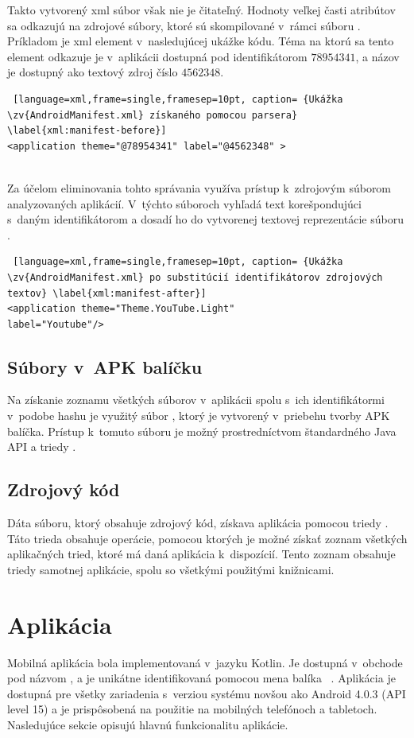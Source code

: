 Takto vytvorený xml súbor však nie je čitateľný. Hodnoty veľkej časti atribútov sa odkazujú na zdrojové súbory, ktoré sú skompilované v~rámci súboru . Príkladom je xml element  v~nasledujúcej ukážke kódu. Téma na ktorú sa tento element odkazuje je v~aplikácii dostupná pod identifikátorom $78954341$, a názov je dostupný ako textový zdroj číslo $4562348$.
\mbox{}\\
\begin{lstlisting} [language=xml,frame=single,framesep=10pt, caption= {Ukážka \zv{AndroidManifest.xml} získaného pomocou parsera} \label{xml:manifest-before}]
<application theme="@78954341" label="@4562348" >
\end{lstlisting}
\mbox{}\\
Za účelom eliminovania tohto správania využíva  prístup k~zdrojovým súborom analyzovaných aplikácií. V~týchto súboroch vyhľadá text korešpondujúci s~daným identifikátorom a dosadí ho do vytvorenej textovej reprezentácie súboru .
\mbox{}\\
\begin{lstlisting} [language=xml,frame=single,framesep=10pt, caption= {Ukážka \zv{AndroidManifest.xml} po substitúcií identifikátorov zdrojových textov} \label{xml:manifest-after}]
<application theme="Theme.YouTube.Light" 
label="Youtube"/>
\end{lstlisting}

\subsection{Súbory v~APK balíčku}
Na získanie zoznamu všetkých súborov v~aplikácii spolu s~ich identifikátormi v~podobe hashu je využitý súbor , ktorý je vytvorený v~priebehu tvorby APK balíčka.  Prístup k~tomuto súboru je možný prostredníctvom štandardného Java API a triedy .

\subsection{Zdrojový kód}
Dáta  súboru, ktorý obsahuje zdrojový kód, získava aplikácia pomocou triedy . Táto trieda obsahuje operácie, pomocou ktorých je možné získať zoznam všetkých aplikačných tried, ktoré má daná aplikácia k~dispozícií. Tento zoznam obsahuje triedy samotnej aplikácie, spolu so všetkými použitými knižnicami. 

\section{Aplikácia}
Mobilná aplikácia bola implementovaná v~jazyku Kotlin. Je dostupná v~obchode  pod názvom , a je unikátne identifikovaná pomocou mena balíka ~\cite{gp}. Aplikácia je dostupná pre všetky zariadenia s~verziou systému novšou ako Android 4.0.3 (API level 15) a  je prispôsobená na použitie na mobilných telefónoch a tabletoch. Nasledujúce sekcie opisujú hlavnú funkcionalitu aplikácie.

